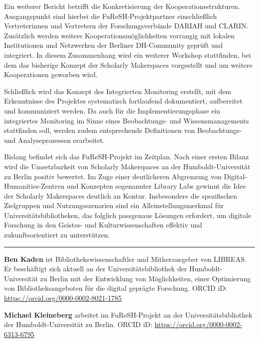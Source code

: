 \documentclass[a4paper,
fontsize=11pt,
oneside,
numbers=noperiodatend,
parskip=half-,
bibliography=totoc,
final
]{scrartcl}
\begin{document}
Ein weiterer Bericht betrifft die Konkretisierung der
Kooperationsstrukturen. Ausgangspunkt sind hierbei die
FuReSH-Projektpartner einschließlich Vertreterinnen und Vertretern der
Forschungsverbünde DARIAH und CLARIN. Zusätzlich werden weitere
Kooperationsmöglichkeiten vorrangig mit lokalen Institutionen und
Netzwerken der Berliner DH-Community geprüft und integriert. In diesem
Zusammenhang wird ein weiterer Workshop stattfinden, bei dem das
bisherige Konzept der Scholarly Makerspaces vorgestellt und um weitere
Kooperationen geworben wird.

Schließlich wird das Konzept des Integrierten Monitoring erstellt, mit
dem Erkenntnisse des Projektes systematisch fortlaufend dokumentiert,
aufbereitet und kommuniziert werden. Da auch für die
Implementierungsphase ein integriertes Monitoring im Sinne eines
Beobachtungs- und Wissensmanagements stattfinden soll, werden zudem
entsprechende Definitionen von Beob\-achtungs- und Analyseprozessen
erarbeitet.

Bislang befindet sich das FuReSH-Projekt im Zeitplan. Nach einer ersten
Bilanz wird die Umsetzbarkeit von Scholarly Makerspaces an der
Humboldt-Universität zu Berlin positiv bewertet. Im Zuge einer
deutlicheren Abgrenzung von Digital-Humanities-Zentren und Konzepten
sogenannter Library Labs gewinnt die Idee der Scholarly Makerspaces
deutlich an Kontur. Insbesondere die spezifischen Zielgruppen und
Nutzungsszenarien sind ein Alleinstellungsmerkmal für
Universitätsbibliotheken, das folglich passgenaue Lösungen erfordert, um
digitale Forschung in den Geistes- und Kulturwissenschaften effektiv und
zukunftsorientiert zu unterstützen.


\begin{center}\rule{0.5\linewidth}{\linethickness}\end{center}

\textbf{Ben Kaden} ist Bibliothekswissenschaftler und Mitherausgeber von
LIBREAS. Er beschäftigt sich aktuell an der Universitätsbibliothek der
Humboldt-Universität zu Berlin mit der Entwicklung von Möglichkeiten,
einer Optimierung von Bibliotheksangeboten für die digital geprägte
Forschung. ORCID iD: \url{https://orcid.org/0000-0002-8021-1785}

\textbf{Michael Kleineberg} arbeitet im FuReSH-Projekt an der
Universitätsbibliothek der Humboldt-Universität zu Berlin. ORCID iD:
\url{https://orcid.org/0000-0002-6313-6795}
\end{document}
